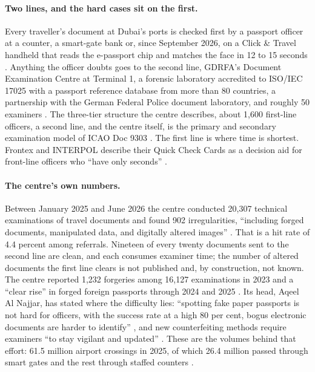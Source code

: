 \documentclass[11pt,a4paper]{article}
\begin{document}
\paragraph{Two lines, and the hard cases sit on the first.} Every traveller's document at Dubai's ports is checked first by a passport officer at a counter, a smart-gate bank or, since September 2026, on a Click \& Travel handheld that reads the e-passport chip and matches the face in 12 to 15 seconds \cite{gdrfa2026clickandtravel,thenational2026click}. Anything the officer doubts goes to the second line, GDRFA's Document Examination Centre at Terminal 1, a forensic laboratory accredited to ISO/IEC 17025 with a passport reference database from more than 80 countries, a partnership with the German Federal Police document laboratory, and roughly 50 examiners \cite{gulfnews2026forgery,gulftoday2026forgery,uaejournal2025fake}. The three-tier structure the centre describes, about 1,600 first-line officers, a second line, and the centre itself, is the primary and secondary examination model of ICAO Doc 9303 \cite{icao9303p2,uaejournal2025fake}. The first line is where time is shortest. Frontex and INTERPOL describe their Quick Check Cards as a decision aid for front-line officers who ``have only seconds'' \cite{frontex2023quickcheck}.

\paragraph{The centre's own numbers.} Between January 2025 and June 2026 the centre conducted 20,307 technical examinations of travel documents and found 902 irregularities, ``including forged documents, manipulated data, and digitally altered images'' \cite{gulfnews2026forgery}. That is a hit rate of 4.4 percent among referrals. Nineteen of every twenty documents sent to the second line are clean, and each consumes examiner time; the number of altered documents the first line clears is not published and, by construction, not known. The centre reported 1,232 forgeries among 16,127 examinations in 2023 and a ``clear rise'' in forged foreign passports through 2024 and 2025 \cite{thenational2024fake,gulfnews2025attorney}. Its head, Aqeel Al Najjar, has stated where the difficulty lies: ``spotting fake paper passports is not hard for officers, with the success rate at a high 80 per cent, bogus electronic documents are harder to identify'' \cite{thenational2024fake}, and new counterfeiting methods require examiners ``to stay vigilant and updated'' \cite{gulfnews2024catch}. These are the volumes behind that effort: 61.5 million airport crossings in 2025, of which 26.4 million passed through smart gates and the rest through staffed counters \cite{gdrfa2025stats}.
\end{document}
